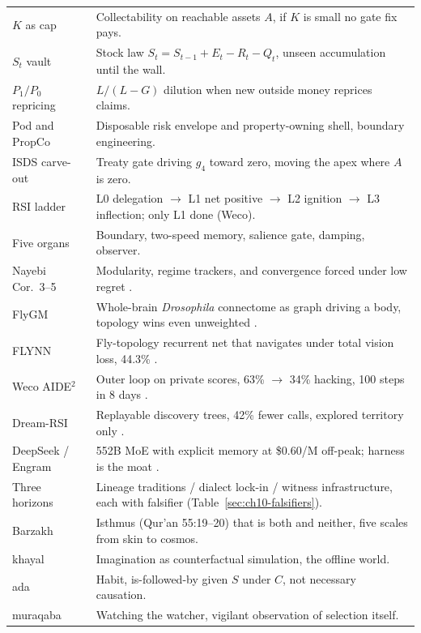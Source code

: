 \begin{center}
\begin{tabular}{p{3.6cm}p{8.8cm}}
$K$ as cap & Collectability on reachable assets $A$, if $K$ is small no gate fix pays. \\
$S_t$ vault & Stock law $S_t=S_{t-1}+E_t-R_t-Q_t$, unseen accumulation until the wall. \\
$P_1/P_0$ repricing & $L/(L-G)$ dilution when new outside money reprices claims. \\
Pod and PropCo & Disposable risk envelope and property-owning shell, boundary engineering. \\
ISDS carve-out & Treaty gate driving $g_4$ toward zero, moving the apex where $A$ is zero. \\
RSI ladder & L0 delegation $\to$ L1 net positive $\to$ L2 ignition $\to$ L3 inflection; only L1 done (Weco). \\
Five organs & Boundary, two-speed memory, salience gate, damping, observer. \\
Nayebi Cor.\ 3--5 & Modularity, regime trackers, and convergence forced under low regret \cite{nayebi2026}. \\
FlyGM & Whole-brain \textit{Drosophila} connectome as graph driving a body, topology wins even unweighted \cite{flygm2026}. \\
FLYNN & Fly-topology recurrent net that navigates under total vision loss, 44.3\% \cite{flynn2026}. \\
Weco AIDE$^{2}$ & Outer loop on private scores, 63\% $\to$ 34\% hacking, 100 steps in 8 days \cite{weco2026}. \\
Dream-RSI & Replayable discovery trees, 42\% fewer calls, explored territory only \cite{dreamrsi2026}. \\
DeepSeek / Engram & 552B MoE with explicit memory at \$0.60/M off-peak; harness is the moat \cite{deepseek2026}. \\
Three horizons & Lineage traditions / dialect lock-in / witness infrastructure, each with falsifier (Table~\ref{sec:ch10-falsifiers}). \\
Barzakh & Isthmus (Qur'an 55:19--20) that is both and neither, five scales from skin to cosmos. \\
khayal & Imagination as counterfactual simulation, the offline world. \\
ada & Habit, is-followed-by given $S$ under $C$, not necessary causation. \\
muraqaba & Watching the watcher, vigilant observation of selection itself. \\
\bottomrule
\end{tabular}
\end{center}

